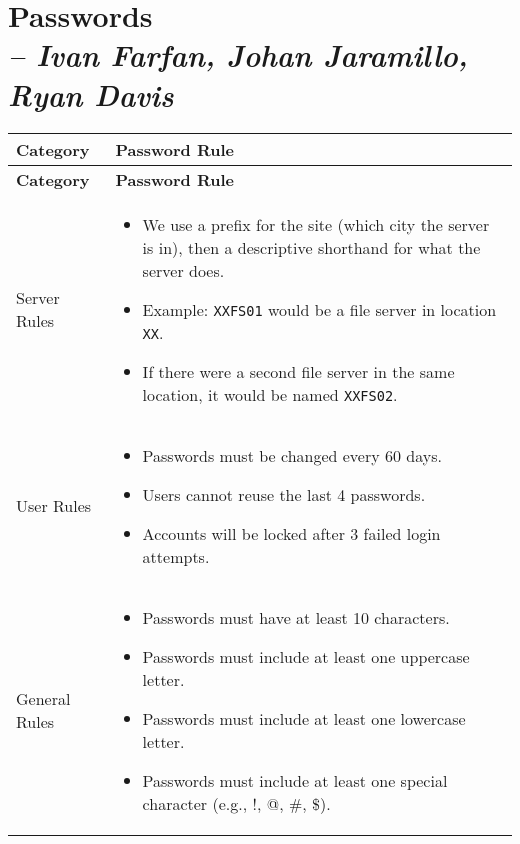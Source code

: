 \chapter{Passwords \\
\small{\textit{-- Ivan Farfan, Johan Jaramillo, Ryan Davis}}}
\label{Chapter::Passwords}
 
\begin{longtable}{|p{3cm}|p{13cm}|}
\hline
\textbf{Category} & \textbf{Password Rule} \\
\hline
\endfirsthead

\hline
\textbf{Category} & \textbf{Password Rule} \\
\hline
\endhead

Server Rules & 
\begin{itemize}
    \item We use a prefix for the site (which city the server is in), then a descriptive shorthand for what the server does. 
    \item Example: \texttt{XXFS01} would be a file server in location \texttt{XX}. 
    \item If there were a second file server in the same location, it would be named \texttt{XXFS02}.
\end{itemize} \\
\hline

User Rules & 
\begin{itemize}
    \item Passwords must be changed every 60 days.
    \item Users cannot reuse the last 4 passwords.  
    \item Accounts will be locked after 3 failed login attempts.
\end{itemize} \\
\hline

General Rules & 
\begin{itemize}
    \item Passwords must have at least 10 characters.
    \item Passwords must include at least one uppercase letter.
    \item Passwords must include at least one lowercase letter.
    \item Passwords must include at least one special character (e.g., !, @, \#, \$).
\end{itemize} \\
\hline


\end{longtable}
